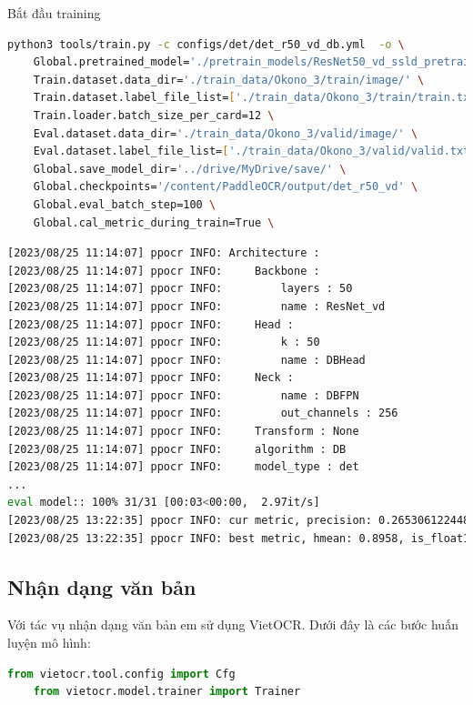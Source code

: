 Bắt đầu training 
\begin{lstlisting}[language=bash]
python3 tools/train.py -c configs/det/det_r50_vd_db.yml  -o \
    Global.pretrained_model='./pretrain_models/ResNet50_vd_ssld_pretrained.pdparams' \
    Train.dataset.data_dir='./train_data/Okono_3/train/image/' \
    Train.dataset.label_file_list=['./train_data/Okono_3/train/train.txt'] \
    Train.loader.batch_size_per_card=12 \
    Eval.dataset.data_dir='./train_data/Okono_3/valid/image/' \
    Eval.dataset.label_file_list=['./train_data/Okono_3/valid/valid.txt'] \
    Global.save_model_dir='../drive/MyDrive/save/' \
    Global.checkpoints='/content/PaddleOCR/output/det_r50_vd' \
    Global.eval_batch_step=100 \
    Global.cal_metric_during_train=True \
\end{lstlisting}
\begin{lstlisting}[language=bash]
[2023/08/25 11:14:07] ppocr INFO: Architecture : 
[2023/08/25 11:14:07] ppocr INFO:     Backbone : 
[2023/08/25 11:14:07] ppocr INFO:         layers : 50
[2023/08/25 11:14:07] ppocr INFO:         name : ResNet_vd
[2023/08/25 11:14:07] ppocr INFO:     Head : 
[2023/08/25 11:14:07] ppocr INFO:         k : 50
[2023/08/25 11:14:07] ppocr INFO:         name : DBHead
[2023/08/25 11:14:07] ppocr INFO:     Neck : 
[2023/08/25 11:14:07] ppocr INFO:         name : DBFPN
[2023/08/25 11:14:07] ppocr INFO:         out_channels : 256
[2023/08/25 11:14:07] ppocr INFO:     Transform : None
[2023/08/25 11:14:07] ppocr INFO:     algorithm : DB
[2023/08/25 11:14:07] ppocr INFO:     model_type : det
...
eval model:: 100% 31/31 [00:03<00:00,  2.97it/s]
[2023/08/25 13:22:35] ppocr INFO: cur metric, precision: 0.2653061224489796, recall: 0.17067833698030635, hmean: 0.20772303595206393, fps: 14.512030517908638
[2023/08/25 13:22:35] ppocr INFO: best metric, hmean: 0.8958, is_float16: False, start_epoch: 156, precision: 0.9292, recall: 0.8648, fps: 13.95, best_epoch: 280
\end{lstlisting}

\subsection{Nhận dạng văn bản}
Với tác vụ nhận dạng văn bản em sử dụng VietOCR. Dưới đây là các bước huấn luyện mô hình:
\begin{lstlisting}[language=Python]
    from vietocr.tool.config import Cfg
    from vietocr.model.trainer import Trainer
\end{lstlisting}


